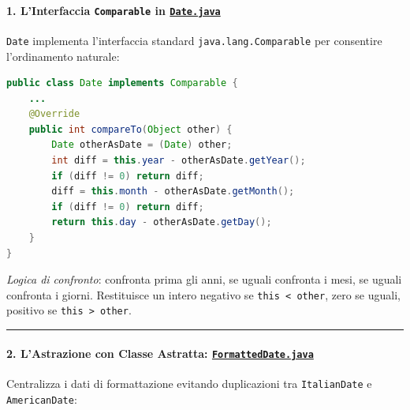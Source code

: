 \documentclass[11pt,a4paper]{article}
\newcommand{\passthrough}[1]{#1}
\begin{document}
\paragraph{\texorpdfstring{1. L'Interfaccia \texttt{Comparable} in
\href{file:///home/wally/Documenti/GitHub/Programmazione-II/25-26/Teoria-e-Esercitazioni/Codice-20260902/Lezione12/MavenDate/src/main/java/it/oop/core/Date.java}{\texttt{Date.java}}}{1. L'Interfaccia Comparable in Date.java}}\label{linterfaccia-comparable-in-date.java}

\passthrough{\lstinline!Date!} implementa l'interfaccia standard
\passthrough{\lstinline!java.lang.Comparable!} per consentire
l'ordinamento naturale:

\begin{lstlisting}[language=Java]
public class Date implements Comparable {
    ...
    @Override
    public int compareTo(Object other) {
        Date otherAsDate = (Date) other;
        int diff = this.year - otherAsDate.getYear();
        if (diff != 0) return diff;
        diff = this.month - otherAsDate.getMonth();
        if (diff != 0) return diff;
        return this.day - otherAsDate.getDay();
    }
}
\end{lstlisting}

\emph{Logica di confronto}: confronta prima gli anni, se uguali
confronta i mesi, se uguali confronta i giorni. Restituisce un intero
negativo se \passthrough{\lstinline!this < other!}, zero se uguali,
positivo se \passthrough{\lstinline!this > other!}.

\begin{center}\rule{0.5\linewidth}{0.5pt}\end{center}

\paragraph{\texorpdfstring{2. L'Astrazione con Classe Astratta:
\href{file:///home/wally/Documenti/GitHub/Programmazione-II/25-26/Teoria-e-Esercitazioni/Codice-20260902/Lezione12/MavenDate/src/main/java/it/oop/core/FormattedDate.java}{\texttt{FormattedDate.java}}}{2. L'Astrazione con Classe Astratta: FormattedDate.java}}\label{lastrazione-con-classe-astratta-formatteddate.java}

Centralizza i dati di formattazione evitando duplicazioni tra
\passthrough{\lstinline!ItalianDate!} e
\passthrough{\lstinline!AmericanDate!}:
\end{document}
